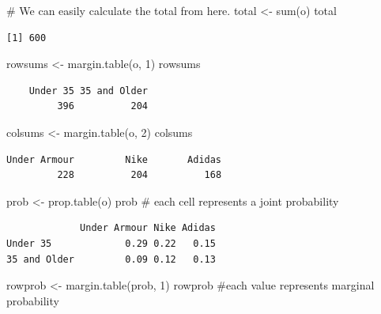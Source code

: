 \documentclass[
  letterpaper,
  DIV=11,
  numbers=noendperiod]{scrreprt}
\newenvironment{Shaded}{\begin{snugshade}}{\end{snugshade}}
\newcommand{\CommentTok}[1]{\textcolor[rgb]{0.37,0.37,0.37}{#1}}
\newcommand{\DecValTok}[1]{\textcolor[rgb]{0.68,0.00,0.00}{#1}}
\newcommand{\FunctionTok}[1]{\textcolor[rgb]{0.28,0.35,0.67}{#1}}
\newcommand{\NormalTok}[1]{\textcolor[rgb]{0.00,0.23,0.31}{#1}}
\newcommand{\OtherTok}[1]{\textcolor[rgb]{0.00,0.23,0.31}{#1}}
\begin{document}
\begin{Shaded}
\begin{Highlighting}[]
\CommentTok{\# We can easily calculate the total from here.}
\NormalTok{total }\OtherTok{\textless{}{-}} \FunctionTok{sum}\NormalTok{(o)}
\NormalTok{total}
\end{Highlighting}
\end{Shaded}

\begin{verbatim}
[1] 600
\end{verbatim}

\begin{Shaded}
\begin{Highlighting}[]
\NormalTok{rowsums }\OtherTok{\textless{}{-}} \FunctionTok{margin.table}\NormalTok{(o, }\DecValTok{1}\NormalTok{)}
\NormalTok{rowsums}
\end{Highlighting}
\end{Shaded}

\begin{verbatim}
    Under 35 35 and Older 
         396          204 
\end{verbatim}

\begin{Shaded}
\begin{Highlighting}[]
\NormalTok{colsums }\OtherTok{\textless{}{-}} \FunctionTok{margin.table}\NormalTok{(o, }\DecValTok{2}\NormalTok{)}
\NormalTok{colsums}
\end{Highlighting}
\end{Shaded}

\begin{verbatim}
Under Armour         Nike       Adidas 
         228          204          168 
\end{verbatim}

\begin{Shaded}
\begin{Highlighting}[]
\NormalTok{prob }\OtherTok{\textless{}{-}} \FunctionTok{prop.table}\NormalTok{(o)}
\NormalTok{prob  }\CommentTok{\# each cell represents a joint probability}
\end{Highlighting}
\end{Shaded}

\begin{verbatim}
             Under Armour Nike Adidas
Under 35             0.29 0.22   0.15
35 and Older         0.09 0.12   0.13
\end{verbatim}

\begin{Shaded}
\begin{Highlighting}[]
\NormalTok{rowprob }\OtherTok{\textless{}{-}} \FunctionTok{margin.table}\NormalTok{(prob, }\DecValTok{1}\NormalTok{)}
\NormalTok{rowprob  }\CommentTok{\#each value represents marginal probability}
\end{Highlighting}
\end{Shaded}
\end{document}
